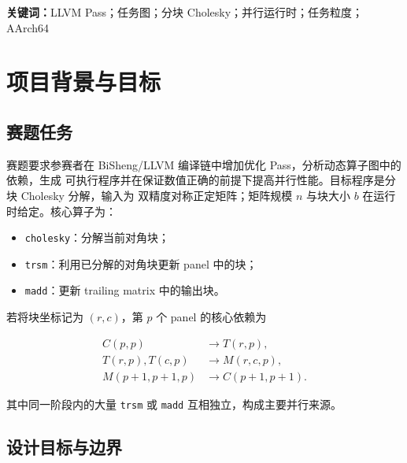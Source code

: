 \documentclass[UTF8,a4paper,openany,11pt,fontset=fandol]{ctexrep}
\begin{document}

\vspace{0.5em}
\noindent\textbf{关键词：}LLVM Pass；任务图；分块 Cholesky；并行运行时；任务粒度；AArch64

\tableofcontents
\listoffigures
\listoftables
\clearpage
{}

\chapter{项目背景与目标}

\section{赛题任务}

赛题要求参赛者在 BiSheng/LLVM 编译链中增加优化 Pass，分析动态算子图中的依赖，生成
可执行程序并在保证数值正确的前提下提高并行性能。目标程序是分块 Cholesky 分解，输入为
双精度对称正定矩阵；矩阵规模 \(n\) 与块大小 \(b\) 在运行时给定。核心算子为：

\begin{itemize}
  \item \texttt{cholesky}：分解当前对角块；
  \item \texttt{trsm}：利用已分解的对角块更新 panel 中的块；
  \item \texttt{madd}：更新 trailing matrix 中的输出块。
\end{itemize}

若将块坐标记为 \((r,c)\)，第 \(p\) 个 panel 的核心依赖为

\begin{align*}
  C(p,p) &\rightarrow T(r,p),\\
  T(r,p),T(c,p) &\rightarrow M(r,c,p),\\
  M(p+1,p+1,p) &\rightarrow C(p+1,p+1).
\end{align*}

其中同一阶段内的大量 \texttt{trsm} 或 \texttt{madd} 互相独立，构成主要并行来源。

\section{设计目标与边界}
\end{document}
